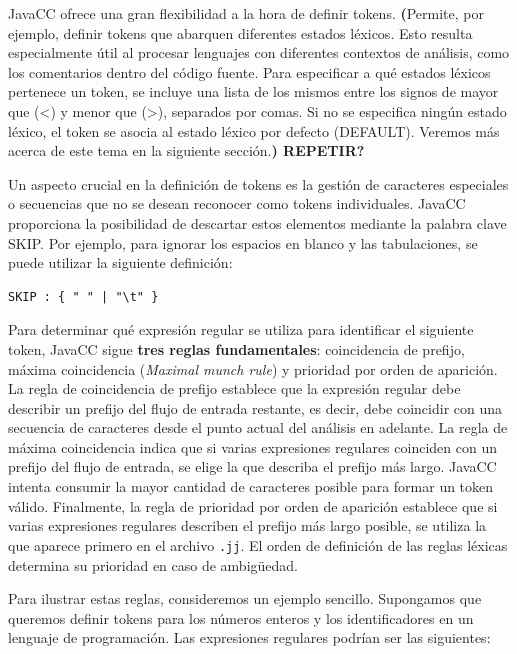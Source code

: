 JavaCC ofrece una gran flexibilidad a la hora de definir tokens. \textbf{(}Permite, por ejemplo, definir tokens que abarquen diferentes estados léxicos. Esto resulta especialmente útil al procesar lenguajes con diferentes contextos de análisis, como los comentarios dentro del código fuente. Para especificar a qué estados léxicos pertenece un token, se incluye una lista de los mismos entre los signos de mayor que (<) y menor que (>), separados por comas. Si no se especifica ningún estado léxico, el token se asocia al estado léxico por defecto (DEFAULT). Veremos más acerca de este tema en la siguiente sección.\textbf{) REPETIR?}

Un aspecto crucial en la definición de tokens es la gestión de caracteres especiales o secuencias que no se desean reconocer como tokens individuales. JavaCC proporciona la posibilidad de descartar estos elementos mediante la palabra clave SKIP. Por ejemplo, para ignorar los espacios en blanco y las tabulaciones, se puede utilizar la siguiente definición:

\lstset{inputencoding=utf8/latin1}
\begin{lstlisting}
SKIP : { " " | "\t" }
\end{lstlisting}

Para determinar qué expresión regular se utiliza para identificar el siguiente token, JavaCC sigue \textbf{tres reglas fundamentales}: coincidencia de prefijo, máxima coincidencia (\textit{Maximal munch rule}) y prioridad por orden de aparición. La regla de coincidencia de prefijo establece que la expresión regular debe describir un prefijo del flujo de entrada restante, es decir, debe coincidir con una secuencia de caracteres desde el punto actual del análisis en adelante. La regla de máxima coincidencia indica que si varias expresiones regulares coinciden con un prefijo del flujo de entrada, se elige la que describa el prefijo más largo. JavaCC intenta consumir la mayor cantidad de caracteres posible para formar un token válido. Finalmente, la regla de prioridad por orden de aparición establece que si varias expresiones regulares describen el prefijo más largo posible, se utiliza la que aparece primero en el archivo \lstinline|.jj|. El orden de definición de las reglas léxicas determina su prioridad en caso de ambigüedad.

Para ilustrar estas reglas, consideremos un ejemplo sencillo. Supongamos que queremos definir tokens para los números enteros y los identificadores en un lenguaje de programación. Las expresiones regulares podrían ser las siguientes:

